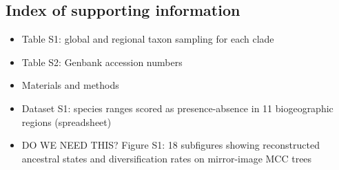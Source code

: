 \subsection{Index of supporting information}

\begin{itemize}
\item Table S1: global and regional taxon sampling for each clade
\item Table S2: Genbank accession numbers
\item Materials and methods
\item Dataset S1: species ranges scored as presence-absence in 11 biogeographic regions (spreadsheet)
\item DO WE NEED THIS? Figure S1: 18 subfigures showing reconstructed ancestral states and diversification rates on mirror-image MCC trees
\end{itemize}